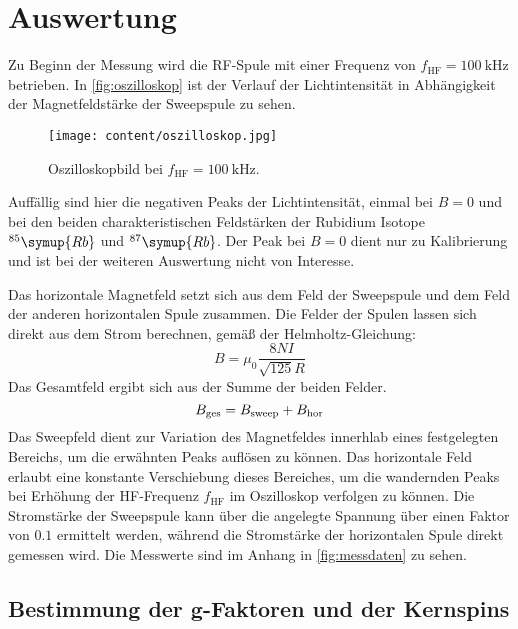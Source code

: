\section{Auswertung}
\label{sec:Auswertung}

Zu Beginn der Messung wird die RF-Spule mit einer Frequenz von $f_{\text{HF}}=\qty{100}{\kilo\hertz}$ betrieben.
In \autoref{fig:oszilloskop} ist der Verlauf der Lichtintensität in Abhängigkeit der Magnetfeldstärke der Sweepspule
zu sehen.

\begin{figure} [H]
  \centering
  \texttt{[image: content/oszilloskop.jpg]}
  \caption{Oszilloskopbild bei $f_{\text{HF}}=\qty{100}{\kilo\hertz}$.}
  \label{fig:oszilloskop}
\end{figure}

Auffällig sind hier die negativen Peaks der Lichtintensität, einmal bei $B=0$ und bei den beiden charakteristischen
Feldstärken der Rubidium Isotope $^{85}\symup{Rb}$ und $^{87}\symup{Rb}$.
Der Peak bei $B=0$ dient nur zu Kalibrierung und ist bei der weiteren Auswertung nicht von Interesse.

Das horizontale Magnetfeld setzt sich aus dem Feld der Sweepspule und dem Feld der anderen horizontalen Spule
zusammen. Die Felder der Spulen lassen sich direkt aus dem Strom berechnen, gemäß der Helmholtz-Gleichung:
\begin{equation}
  B =\mu_0 \frac{8NI}{\sqrt{125}R}
  \label{eq:Bfeld}
\end{equation}
Das Gesamtfeld ergibt sich aus der Summe der beiden Felder.
\begin{equation}
  B_{\text{ges}} = B_{\text{sweep}} + B_{\text{hor}}
  \notag
\end{equation}
Das Sweepfeld dient zur Variation des Magnetfeldes innerhlab eines festgelegten Bereichs, um die erwähnten Peaks auflösen zu können.
Das horizontale Feld erlaubt eine konstante Verschiebung dieses Bereiches, um die wandernden Peaks bei Erhöhung der HF-Frequenz
$f_{\text{HF}}$ im Oszilloskop verfolgen zu können.
Die Stromstärke der Sweepspule kann über die angelegte Spannung über einen Faktor von $0.1$ ermittelt werden, während die
Stromstärke der horizontalen Spule direkt gemessen wird. Die Messwerte sind im Anhang in \autoref{fig:messdaten} zu sehen.

\subsection{Bestimmung der g-Faktoren und der Kernspins}

